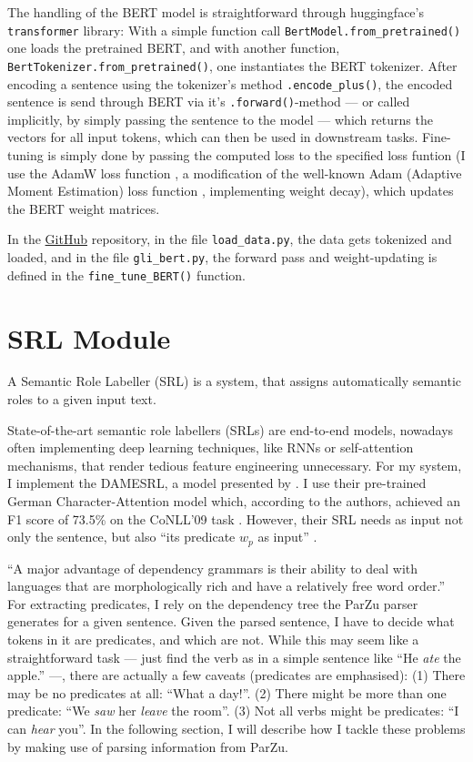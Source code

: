The handling of the BERT model is straightforward through huggingface's \texttt{transformer}
library: With a simple function call \texttt{BertModel.from\_pretrained()} one loads the
pretrained BERT, and with another function, \texttt{BertTokenizer.from\_pretrained()},
one instantiates the BERT tokenizer.
After encoding a sentence using the tokenizer's method \texttt{.encode\_plus()}, the
encoded sentence is send through BERT via it's \texttt{.forward()}-method --- or
called implicitly, by simply passing the sentence to the model --- which returns the
vectors for all input tokens, which can then be used in downstream tasks. Fine-tuning
is simply done by passing the computed loss to the specified loss funtion (I use the
AdamW loss function \citep{loshchilov2019decoupled}, a modification of the well-known
Adam (Adaptive Moment Estimation) loss function \citep{kingma2014adam}, implementing
weight decay), which updates the BERT weight matrices.


In the \href{https://github.com/JonathanSchaber/Masterarbeit}{GitHub} repository, in
the file \texttt{load\_data.py}, the data gets tokenized and loaded, and in
the file \texttt{gli\_bert.py}, the forward pass and weight-updating is
defined in the \texttt{fine\_tune\_BERT()} function.


\section{SRL Module}
\label{sec:srl-module}

A Semantic Role Labeller (SRL) is a system, that assigns automatically semantic roles to a
given input text.

State-of-the-art semantic role labellers (SRLs) are end-to-end models, nowadays often
implementing deep learning techniques, like RNNs or self-attention mechanisms, that render
tedious feature engineering unnecessary.  For my system, I implement the DAMESRL, a model
presented by \cite{do2018flexible}.  I use their pre-trained German Character-Attention
model which, according to the authors, achieved an F1 score of 73.5\% on the CoNLL'09 task
\citep{hajivc2009conll}.  However, their SRL needs as input not only the sentence, but also
``its predicate $w_p$ as input'' \citep{do2018flexible}.

``A major advantage of dependency grammars is their ability to deal with languages that are
morphologically rich and have a relatively free word order.'' \citep[p.~274]{jurafsky2019speech}
For extracting predicates, I rely on the dependency tree the ParZu parser
\cite{sennrich2013exploiting} generates for a given sentence.  Given the parsed sentence, I
have to decide what tokens in it are predicates, and which are not.  While this may seem like
a straightforward task --- just find the verb as in a simple sentence like ``He \emph{ate}
the apple.'' ---, there are actually a few caveats (predicates are emphasised): (1) There
may be no predicates at all: ``What a day!''. (2) There might be more than one predicate:
``We \emph{saw} her \emph{leave} the room''. (3) Not all verbs might be predicates: ``I can
\emph{hear} you''.  In the following section, I will describe how I tackle these problems by
making use of parsing information from ParZu.


